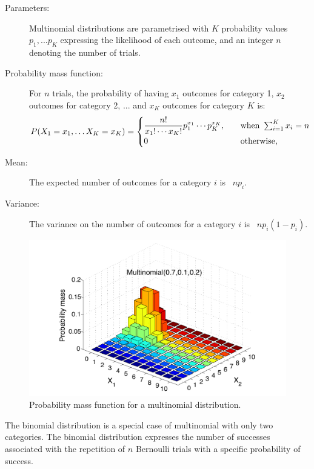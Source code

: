 \begin{description}
\item [Parameters: ] Multinomial distributions are parametrised with $K$ probability values $p_1,...p_K$ expressing the likelihood of each outcome, and an integer $n$ denoting the number of trials.

\item [Probability mass function: ] For $n$ trials,  the probability of having $x_1$ outcomes for category 1, $x_2$ outcomes for category 2, ... and $x_K$ outcomes for category $K$ is:
\begin{align}
P(X_1 = x_1,\dots X_K = x_K)  = \begin{cases} { \displaystyle {n! \over x_1!\cdots x_K!}p_1^{x_1}\cdots p_K^{x_K}}, \quad &
\mbox{when } \sum_{i=1}^K x_i=n \\
0 & \mbox{otherwise,} \end{cases}
\end{align} 
\item [Mean: ] The expected number of outcomes for a category $i$ is \ $ n p_i$.

\item [Variance: ] The variance on the number of outcomes for a category $i$ is \ $n  p_i (1-p_i)$.
\end{description}

\begin{figure}[h!]
\centering
\includegraphics[scale=0.40]{imgs/multinomial_appendix.pdf}
\caption{Probability mass function for a multinomial distribution.} 
\label{fig:multinomial-appendix}
\end{figure}

The binomial distribution is a special case of multinomial with only two categories.  The binomial distribution expresses the number of successes associated with the repetition of $n$ Bernoulli trials with a specific probability of success. 

